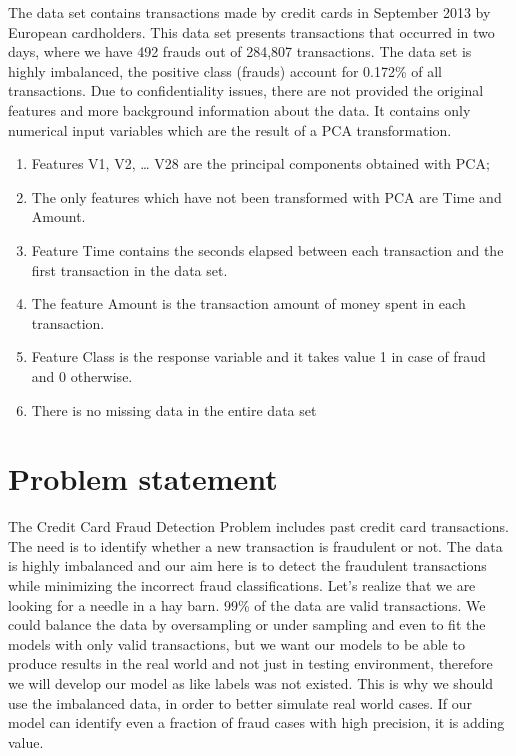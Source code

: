 \documentclass[20pt,a4paper]{article}
\begin{document}
    The data set contains transactions made by credit cards in September
    2013 by European cardholders. This data set presents transactions that
    occurred in two days, where we have 492 frauds out of 284,807
    transactions. The data set is highly imbalanced, the positive class
    (frauds) account for 0.172\% of all transactions.
    Due to confidentiality issues, there are not provided the original
    features and more background information about the data. It contains
    only numerical input variables which are the result of a PCA
    transformation.
    
    \begin{enumerate}[label=\roman*)]
    \item
      Features V1, V2, \ldots{} V28 are the principal components obtained
      with PCA;
    \item
      The only features which have not been transformed with PCA are Time
      and Amount.
    \item
      Feature Time contains the seconds elapsed between each transaction and
      the first transaction in the data set.
    \item
      The feature Amount is the transaction amount of money spent in each transaction.
    \item
      Feature Class is the response variable and it takes value 1 in case of
      fraud and 0 otherwise.
    \item
      There is no missing data in the entire data set
    \end{enumerate}

\section{Problem statement}
The Credit Card Fraud Detection Problem includes past credit card
transactions. The need is to identify whether a new transaction is
fraudulent or not. The data is highly imbalanced and our aim here is to
detect the fraudulent transactions while minimizing the incorrect fraud
classifications. Let's realize that we are looking for a needle in a hay
barn. 99\% of the data are valid transactions. We could balance the data
by oversampling or under sampling and even to fit the models with only
valid transactions, but we want our models to be able to produce results
in the real world and not just in testing environment, therefore we will
develop our model as like labels was not existed. This is why we should
use the imbalanced data, in order to better simulate real world cases.
If our model can identify even a fraction of fraud cases with high
precision, it is adding value.
\end{document}
